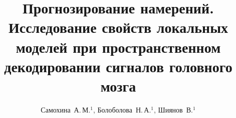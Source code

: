 \documentclass[12pt,twoside]{article}
\title
    [Прогнозирование намерений] 
    {Прогнозирование намерений. Исследование свойств локальных моделей при пространственном декодировании сигналов головного мозга}
\author
    [Самохина~А.\,М.] %
    {Самохина~А.\,М.$^1$, Болоболова~Н.\,А.$^1$, Шиянов~В.$^1$} %
\begin{document}
\maketitle
\bigskip
\bigskip
\bigskip
\bigskip
\maketitleSecondary
\end{document}
